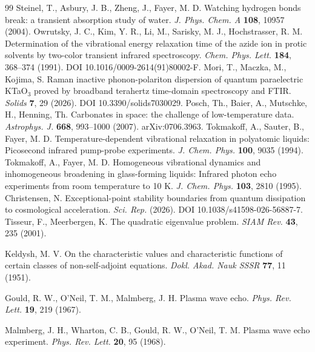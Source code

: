 \begin{thebibliography}{99}
 Steinel, T., Asbury, J. B., Zheng, J., Fayer, M. D. Watching hydrogen bonds break: a transient absorption study of water. \textit{J. Phys. Chem. A} \textbf{108}, 10957 (2004).
 Owrutsky, J. C., Kim, Y. R., Li, M., Sarisky, M. J., Hochstrasser, R. M. Determination of the vibrational energy relaxation time of the azide ion in protic solvents by two-color transient infrared spectroscopy. \textit{Chem. Phys. Lett.} \textbf{184}, 368--374 (1991). DOI 10.1016/0009-2614(91)80002-F.
 Mori, T., Maczka, M., Kojima, S. Raman inactive phonon-polariton dispersion of quantum paraelectric KTaO\(_3\) proved by broadband terahertz time-domain spectroscopy and FTIR. \textit{Solids} \textbf{7}, 29 (2026). DOI 10.3390/solids7030029.
 Posch, Th., Baier, A., Mutschke, H., Henning, Th. Carbonates in space: the challenge of low-temperature data. \textit{Astrophys. J.} \textbf{668}, 993--1000 (2007). arXiv:0706.3963.
 Tokmakoff, A., Sauter, B., Fayer, M. D. Temperature-dependent vibrational relaxation in polyatomic liquids: Picosecond infrared pump-probe experiments. \textit{J. Chem. Phys.} \textbf{100}, 9035 (1994).
 Tokmakoff, A., Fayer, M. D. Homogeneous vibrational dynamics and inhomogeneous broadening in glass-forming liquids: Infrared photon echo experiments from room temperature to 10 K. \textit{J. Chem. Phys.} \textbf{103}, 2810 (1995).
 Christensen, N. Exceptional-point stability boundaries from quantum dissipation to cosmological acceleration. \textit{Sci. Rep.} (2026). DOI 10.1038/s41598-026-56887-7.
 Tisseur, F., Meerbergen, K. The quadratic eigenvalue problem. \textit{SIAM Rev.} \textbf{43}, 235 (2001).

 Keldysh, M. V. On the characteristic values and characteristic functions of certain classes of non-self-adjoint equations. \textit{Dokl. Akad. Nauk SSSR} \textbf{77}, 11 (1951).

 Gould, R. W., O'Neil, T. M., Malmberg, J. H. Plasma wave echo. \textit{Phys. Rev. Lett.} \textbf{19}, 219 (1967).

 Malmberg, J. H., Wharton, C. B., Gould, R. W., O'Neil, T. M. Plasma wave echo experiment. \textit{Phys. Rev. Lett.} \textbf{20}, 95 (1968).


\end{thebibliography}
